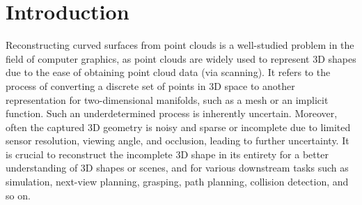 \chapter{Introduction}\label{ch:introduction}
Reconstructing curved surfaces from point clouds is a well-studied problem in the field of computer graphics, as point clouds are widely used to represent 3D shapes due to the ease of obtaining point cloud data (via scanning). It refers to the process of converting a discrete set of points in 3D space to another representation for two-dimensional manifolds, such as a mesh or an implicit function. Such an underdetermined process is inherently uncertain. Moreover, often the captured 3D geometry is noisy and sparse or incomplete due to limited sensor resolution, viewing angle, and occlusion, leading to further uncertainty. It is crucial to reconstruct the incomplete 3D shape in its entirety for a better understanding of 3D shapes or scenes, and for various downstream tasks such as simulation, next-view planning, grasping, path planning, collision detection, and so on. 

